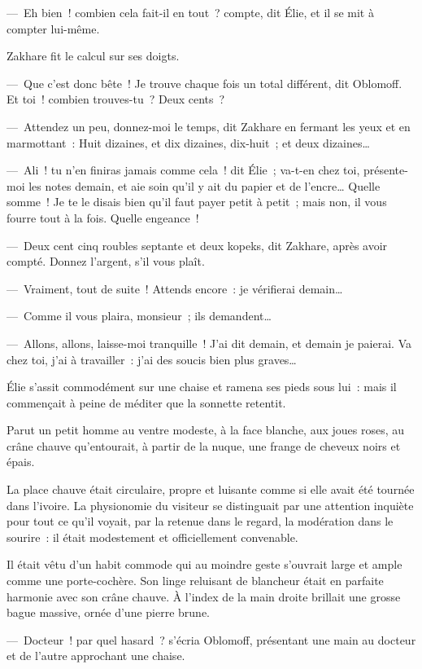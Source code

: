 \documentclass[french,twoside]{book} %
\begin{document}
— Eh bien ! combien cela fait-il en tout ? compte, dit Élie, et il se mit à compter lui-même.\par
Zakhare fit le calcul sur ses doigts.\par
— Que c’est donc bête ! Je trouve chaque fois un total différent, dit Oblomoff. Et toi ! combien trouves-tu ? Deux cents ?\par
— Attendez un peu, donnez-moi le temps, dit Zakhare en fermant les yeux et en marmottant : Huit dizaines, et dix dizaines, dix-huit ; et deux dizaines…\par
— Ali ! tu n’en finiras jamais comme cela ! dit Élie ; va-t-en chez toi, présente-moi les notes demain, et aie soin qu’il y ait du papier et de l’encre… Quelle somme ! Je te le disais bien qu’il faut payer petit à petit ; mais non, il vous fourre tout à la fois. Quelle engeance !\par
— Deux cent cinq roubles septante et deux kopeks, dit Zakhare, après avoir compté. Donnez l’argent, s’il vous plaît.\par
— Vraiment, tout de suite ! Attends encore : je vérifierai demain…\par
— Comme il vous plaira, monsieur ; ils demandent…\par
— Allons, allons, laisse-moi tranquille ! J’ai dit demain, et demain je paierai. Va chez toi, j’ai à travailler : j’ai des soucis bien plus graves…\par
Élie s’assit commodément sur une chaise et ramena ses pieds sous lui : mais il commençait à peine de méditer que la sonnette retentit.\par
Parut un petit homme au ventre modeste, à la face blanche, aux joues roses, au crâne chauve qu’entourait, à partir de la nuque, une frange de cheveux noirs et épais.\par
La place chauve était circulaire, propre et luisante comme si elle avait été tournée dans l’ivoire. La physionomie du visiteur se distinguait par une attention inquiète pour tout ce qu’il voyait, par la retenue dans le regard, la modération dans le sourire : il était modestement et officiellement convenable.\par
Il était vêtu d’un habit commode qui au moindre geste s’ouvrait large et ample comme une porte-cochère. Son linge reluisant de blancheur était en parfaite harmonie avec son crâne chauve. À l’index de la main droite brillait une grosse bague massive, ornée d’une pierre brune.\par
— Docteur ! par quel hasard ? s’écria Oblomoff, présentant une main au docteur et de l’autre approchant une chaise.\par
\end{document}
